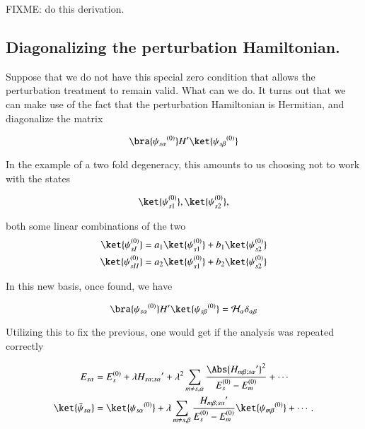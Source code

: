 FIXME: do this derivation.

\subsection{Diagonalizing the perturbation Hamiltonian.}

Suppose that we do not have this special zero condition that allows the perturbation treatment to remain valid.  What can we do.  It turns out that we can make use of the fact that the perturbation Hamiltonian is Hermitian, and diagonalize the matrix

\begin{equation}\label{eqn:qmTwoL5:110}
\bra{{\psi_{s \alpha}}^{(0)}} H' \ket{{\psi_{s \beta}}^{(0)}} 
\end{equation}

In the example of a two fold degeneracy, this amounts to us choosing not to work with the states

\begin{equation}\label{eqn:qmTwoL5:130}
\ket{\psi_{s1}^{(0)}}, \ket{\psi_{s2}^{(0)}},
\end{equation}

both some linear combinations of the two
\begin{align}\label{eqn:qmTwoL5:150}
\ket{\psi_{sI}^{(0)}} &= a_1 \ket{\psi_{s1}^{(0)}} + b_1 \ket{\psi_{s2}^{(0)}} \\
\ket{\psi_{sII}^{(0)}} &= a_2 \ket{\psi_{s1}^{(0)}} + b_2 \ket{\psi_{s2}^{(0)}} 
\end{align}

In this new basis, once found, we have

\begin{equation}\label{eqn:qmTwoL5:170}
\bra{{\psi_{s \alpha}}^{(0)}} H' \ket{{\psi_{s \beta}}^{(0)}} = \mathcal{H}_\alpha \delta_{\alpha \beta}
\end{equation}

Utilizing this to fix the previous, one would get if the analysis was repeated correctly

\begin{align}\label{eqn:qmTwoL5:190}
E_{s\alpha} &= E_s^{(0)} + \lambda {H_{s\alpha ; s\alpha}}' 
+ \lambda^2 
\sum_{m \ne s, \alpha} 
\frac{\Abs{{H_{m \beta ; s \alpha}}'}^2 }
{ E_s^{(0)} - E_m^{(0)} } 
+ \cdots
\\
\ket{\bar{\psi}_{s \alpha}} &= \ket{{\psi_{s \alpha}}^{(0)}} 
+ \lambda
\sum_{m \ne s, \beta} 
\frac{{H_{m \beta ; s \alpha}}'}
{ E_s^{(0)} - E_m^{(0)} } \ket{{\psi_{m \beta}}^{(0)}}
+ \cdots.
\end{align}

